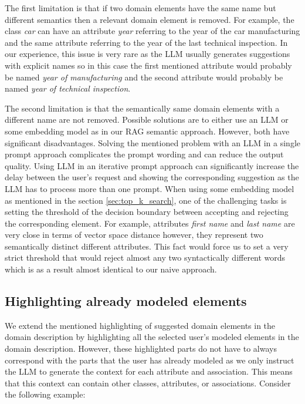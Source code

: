 The first limitation is that if two domain elements have the same name but different semantics then a relevant domain element is removed. For example, the class \textit{car} can have an attribute \textit{year} referring to the year of the car manufacturing and the same attribute referring to the year of the last technical inspection. In our experience, this issue is very rare as the LLM usually generates suggestions with explicit names so in this case the first mentioned attribute would probably be named \textit{year of manufacturing} and the second attribute would probably be named \textit{year of technical inspection}.

The second limitation is that the semantically same domain elements with a different name are not removed. Possible solutions are to either use an LLM or some embedding model as in our RAG semantic approach. However, both have significant disadvantages. Solving the mentioned problem with an LLM in a single prompt approach complicates the prompt wording and can reduce the output quality. Using LLM in an iterative prompt approach can significantly increase the delay between the user's request and showing the corresponding suggestion as the LLM has to process more than one prompt. When using some embedding model as mentioned in the section \ref{sec:top_k_search}, one of the challenging tasks is setting the threshold of the decision boundary between accepting and rejecting the corresponding element. For example, attributes \textit{first name} and \textit{last name} are very close in terms of vector space distance however, they represent two semantically distinct different attributes. This fact would force us to set a very strict threshold that would reject almost any two syntactically different words which is as a result almost identical to our naive approach.


\subsection{Highlighting already modeled elements}
\label{sec:highlighting_already_modeled_elements}

We extend the mentioned highlighting of suggested domain elements in the domain description by highlighting all the selected user's modeled elements in the domain description. However, these highlighted parts do not have to always correspond with the parts that the user has already modeled as we only instruct the LLM to generate the context for each attribute and association. This means that this context can contain other classes, attributes, or associations. Consider the following example: \\

